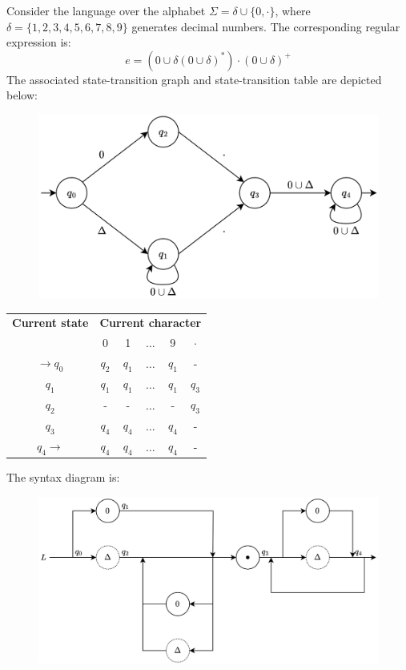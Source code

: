 \begin{example}
    Consider the language over the alphabet $\Sigma=\delta \cup \{0,\cdot\}$, where $\delta=\{1,2,3,4,5,6,7,8,9\}$ generates decimal numbers. 
    The corresponding regular expression is:
    \[e=\left( 0 \cup \delta (0 \cup \delta)^{*} \right) \cdot (0 \cup \delta)^{+}\]
    The associated state-transition graph and state-transition table are depicted below:
    \begin{figure}[H]
        \centering
        \includegraphics[width=0.75\linewidth]{images/fsa1.png}
    \end{figure}
    \begin{table}[H]
        \centering
        \begin{tabular}{|c|ccccc|}
        \hline
        \textbf{Current state} & \multicolumn{5}{c|}{\textbf{Current character}}\\ \cline {2-6}
                               & 0      & 1      & $\dots$  & 9      & $\cdot$  \\ \hline
        $\rightarrow q_0$      & $q_2$  & $q_1$  & $\dots$  & $q_1$  & -        \\
        $q_1$                  & $q_1$  & $q_1$  & $\dots$  & $q_1$  & $q_3$    \\
        $q_2$                  & -      & -      & $\dots$  & -      & $q_3$    \\
        $q_3$                  & $q_4$  & $q_4$  & $\dots$  & $q_4$  & -        \\
        $q_4 \rightarrow$      & $q_4$  & $q_4$  & $\dots$  & $q_4$  & -        \\ \hline
        \end{tabular}
    \end{table}
    The syntax diagram is:
    \begin{figure}[H]
        \centering
        \includegraphics[width=0.75\linewidth]{images/fsa2.png}
    \end{figure}
\end{example}